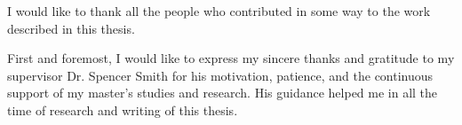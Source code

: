 
I would like to thank all the people who contributed in some way to the work described
in this thesis.

First and foremost, I would like to express my sincere thanks and gratitude to my supervisor Dr. Spencer Smith for his motivation, patience, and the continuous support of my master’s studies and research. His guidance helped me in all the time of research and writing of this thesis.